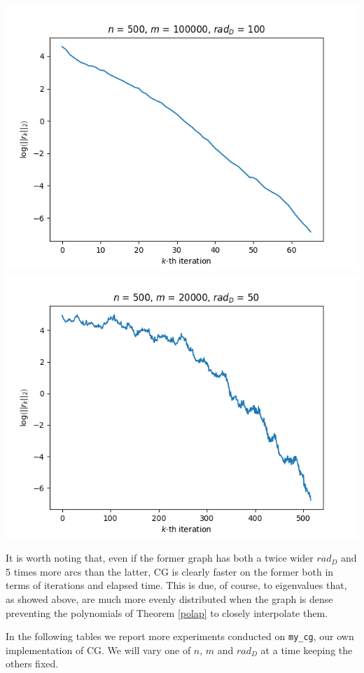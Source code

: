 \documentclass[12pt]{article}
\newcommand{\1}{\mathbbm{1}}
\begin{document}
{\includegraphics[scale=0.5, H]{my_cg-500-100000-100.png}
\includegraphics[scale=0.5, H]{my_cg-500-20000-50.png}

It is worth noting that, even if the former graph has both a twice wider $rad_D$ and 5 times more arcs than the latter, CG is clearly faster on the former both in terms of iterations and elapsed time. This is due, of course, to eigenvalues that, as showed above, are much more evenly distributed
when the graph is dense preventing the polynomials of Theorem \ref{polap} to closely interpolate them. 

In the following tables we report more experiments conducted on \texttt{my\_cg}, our own implementation of CG. We will vary one of $n$, $m$ and $rad_D$ at a time keeping the others fixed.

}
\end{document}
